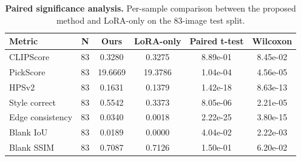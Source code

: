 \begin{table}[t]
\centering
\small
\caption{\textbf{Paired significance analysis.} Per-sample comparison between the proposed method and LoRA-only on the 83-image test split.}
\label{tab:significance-ours-vs-lora}
\begin{tabular}{lccccc}
\toprule
\textbf{Metric} & \textbf{N} & \textbf{Ours} & \textbf{LoRA-only} & \textbf{Paired t-test} & \textbf{Wilcoxon} \\
\midrule
CLIPScore & 83 & 0.3280 & 0.3275 & 8.89e-01 & 8.45e-02 \\
PickScore & 83 & 19.6669 & 19.3786 & 1.04e-04 & 4.56e-05 \\
HPSv2 & 83 & 0.1631 & 0.1379 & 1.42e-18 & 8.63e-13 \\
Style correct & 83 & 0.5542 & 0.3373 & 8.05e-06 & 2.21e-05 \\
Edge consistency & 83 & 0.0340 & 0.0018 & 2.22e-25 & 3.80e-15 \\
Blank IoU & 83 & 0.0189 & 0.0000 & 4.04e-02 & 2.22e-03 \\
Blank SSIM & 83 & 0.7087 & 0.7126 & 1.50e-01 & 6.20e-02 \\
\bottomrule
\end{tabular}
\end{table}
